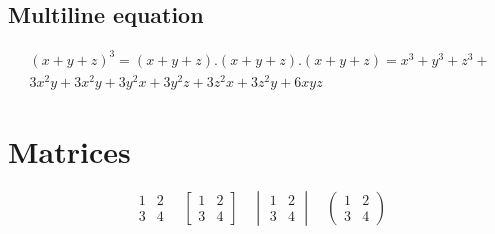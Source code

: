 \documentclass[18]{article}
\begin{document}
\subsection{Multiline equation}
\begin{multline*}
(x+y+z)^3=(x+y+z).(x+y+z).(x+y+z)=x^3+y^3+z^3+ \\
3x^2y+3x^2y+3y^2x+3y^2z+3z^2x+3z^2y+6xyz
\end{multline*}
\section{Matrices}
\[
\begin{matrix}
1 & 2 \\
3 & 4
\end{matrix}
\quad
\begin{bmatrix}
1 & 2 \\
3 & 4
\end{bmatrix}
\quad
\begin{vmatrix}
1 & 2 \\
3 & 4
\end{vmatrix}
\quad
\begin{pmatrix}
1 & 2 \\
3 & 4
\end{pmatrix}
\]
\end{document}
